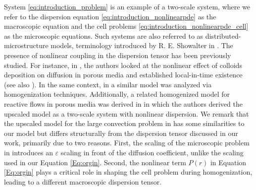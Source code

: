 \documentclass[11pt]{article}
\begin{document}
System \eqref{eq:introduction_problem} is an example of a two-scale system, where we refer to the dispersion equation \eqref{eq:introduction_nonlinearpde} as the macroscopic equation and the cell problems \eqref{eq:introduction_nonlinearpde_cell} as the microscopic equations.
Such systems are also referred to as distributed-microstructure models, terminology introduced by R. E. Showalter in  \cite{showalter1993distributed}.
The presence of nonlinear coupling in the dispersion tensor has been previously studied.
For instance, in \cite{EDEN2022103408}, the authors looked at the nonlinear effect of colloids deposition on diffusion in porous media and established local-in-time existence (see also \cite{Adrian_siap,nikolopoulos2023multiscale}). 
In the same context, in \cite{Wiedemann2023} a similar model was analyzed via homogenization techniques.
Additionally, a related homogenized model for reactive flows in porous media was derived in \cite{allaire2016} {in which the authors derived the upscaled model as a two-scale system with nonlinear dispersion}. {We remark that the upscaled model for the large convection problem in \cite{Amaziane} 
 has some similarities to our model but differs structurally from the dispersion tensor discussed in our work, primarily due to two reasons. First, the scaling of the microscopic problem in \cite{Amaziane} introduces an $\varepsilon$ scaling in front of the diffusion coefficient, unlike the scaling used in our Equation \eqref{Eq:orgin}. Second, the nonlinear term 
$P(r)$ in Equation \eqref{Eq:orgin} plays a critical role in shaping the cell problem during homogenization, leading to a different macroscopic dispersion tensor. }
\end{document}

